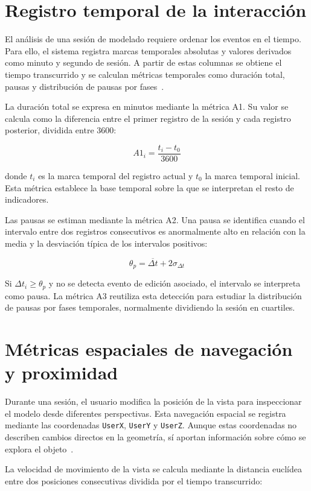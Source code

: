 \section{Registro temporal de la interacción}

El análisis de una sesión de modelado requiere ordenar los eventos en el tiempo. Para ello, el sistema registra marcas temporales absolutas y valores derivados como minuto y segundo de sesión. A partir de estas columnas se obtiene el tiempo transcurrido y se calculan métricas temporales como duración total, pausas y distribución de pausas por fases~\cite{xie2014}.

La duración total se expresa en minutos mediante la métrica A1. Su valor se calcula como la diferencia entre el primer registro de la sesión y cada registro posterior, dividida entre 3600:

\[
A1_i = \frac{t_i - t_0}{3600}
\]

donde $t_i$ es la marca temporal del registro actual y $t_0$ la marca temporal inicial. Esta métrica establece la base temporal sobre la que se interpretan el resto de indicadores.

Las pausas se estiman mediante la métrica A2. Una pausa se identifica cuando el intervalo entre dos registros consecutivos es anormalmente alto en relación con la media y la desviación típica de los intervalos positivos:

\[
\theta_p = \overline{\Delta t} + 2\sigma_{\Delta t}
\]

Si $\Delta t_i \geq \theta_p$ y no se detecta evento de edición asociado, el intervalo se interpreta como pausa. La métrica A3 reutiliza esta detección para estudiar la distribución de pausas por fases temporales, normalmente dividiendo la sesión en cuartiles.

\section{Métricas espaciales de navegación y proximidad}

Durante una sesión, el usuario modifica la posición de la vista para inspeccionar el modelo desde diferentes perspectivas. Esta navegación espacial se registra mediante las coordenadas \texttt{UserX}, \texttt{UserY} y \texttt{UserZ}. Aunque estas coordenadas no describen cambios directos en la geometría, sí aportan información sobre cómo se explora el objeto~\cite{jankowski2014,lavioila2017}.

La velocidad de movimiento de la vista se calcula mediante la distancia euclídea entre dos posiciones consecutivas dividida por el tiempo transcurrido:

